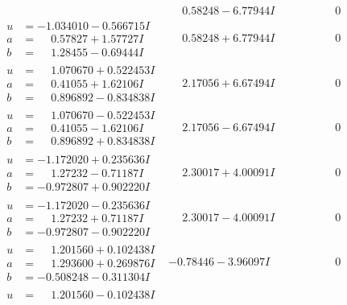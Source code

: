 \documentclass[1p]{elsarticle_modified}
\theoremstyle{definition}
\begin{document}
$$\begin{array}{c|c|c}
 & \phantom{-}0.58248 - 6.77944 I & \phantom{-0.000000 } 0 \\ \hline\begin{aligned}
u &= -1.034010 - 0.566715 I \\
a &= \phantom{-}0.57827 + 1.57727 I \\
b &= \phantom{-}1.28455 - 0.69444 I\end{aligned}
 & \phantom{-}0.58248 + 6.77944 I & \phantom{-0.000000 } 0 \\ \hline\begin{aligned}
u &= \phantom{-}1.070670 + 0.522453 I \\
a &= \phantom{-}0.41055 + 1.62106 I \\
b &= \phantom{-}0.896892 - 0.834838 I\end{aligned}
 & \phantom{-}2.17056 + 6.67494 I & \phantom{-0.000000 } 0 \\ \hline\begin{aligned}
u &= \phantom{-}1.070670 - 0.522453 I \\
a &= \phantom{-}0.41055 - 1.62106 I \\
b &= \phantom{-}0.896892 + 0.834838 I\end{aligned}
 & \phantom{-}2.17056 - 6.67494 I & \phantom{-0.000000 } 0 \\ \hline\begin{aligned}
u &= -1.172020 + 0.235636 I \\
a &= \phantom{-}1.27232 - 0.71187 I \\
b &= -0.972807 + 0.902220 I\end{aligned}
 & \phantom{-}2.30017 + 4.00091 I & \phantom{-0.000000 } 0 \\ \hline\begin{aligned}
u &= -1.172020 - 0.235636 I \\
a &= \phantom{-}1.27232 + 0.71187 I \\
b &= -0.972807 - 0.902220 I\end{aligned}
 & \phantom{-}2.30017 - 4.00091 I & \phantom{-0.000000 } 0 \\ \hline\begin{aligned}
u &= \phantom{-}1.201560 + 0.102438 I \\
a &= \phantom{-}1.293600 + 0.269876 I \\
b &= -0.508248 - 0.311304 I\end{aligned}
 & -0.78446 - 3.96097 I & \phantom{-0.000000 } 0 \\ \hline\begin{aligned}
u &= \phantom{-}1.201560 - 0.102438 I \\

\end{aligned}
\end{array}$$
\end{document}
